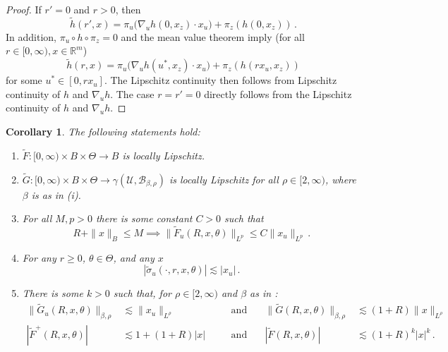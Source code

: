 \documentclass[final]{amsart}
\newtheorem{cor}[thm]{Corollary}
\numberwithin{thm}{section}
\numberwithin{equation}{section}
\newcommand{\U}{\mathcal{U}}
\newcommand{\R}{\mathbb{R}}
\newcommand{\B}{\mathcal{B}}
\begin{document}
\begin{proof}
 If $r' = 0$ and $r > 0$, then 
\begin{equation}
    \tilde h(r',x) = \pi_u\Big( \nabla_u h(0,x_z)\cdot x_u\Big) + \pi_z(h(0,x_z)) \,.
\end{equation}
 In addition, 
$\pi_u \circ h \circ \pi_z = 0$ and the  mean value theorem imply  (for all $r \in [0,\infty), x \in \R^m$)
\begin{equation}\label{eq:mvt-for-tilde-h}
    \tilde h(r,x) = \pi_u\Big( \nabla_u h(u^*,x_z) \cdot x_u\Big) + \pi_z(h(rx_u,x_z))
\end{equation}
for some $u^* \in [0,rx_u]$. The Lipschitz continuity then follows 
from Lipschitz continuity of $h$ and $\nabla_u h$. 
The case $r = r' = 0$ directly follows from the Lipschitz continuity of $h$ and $\nabla_u h$. 
\end{proof}

\begin{cor}\label{lem:lipschitz-f-g}
The following statements hold:
\begin{enumerate}[label=(\roman*)]
    \item $\tilde F: [0,\infty) \times B \times \Theta \to B$ is locally Lipschitz.
    \item $\tilde G: [0,\infty) \times B \times \Theta \to \gamma(\U,\B_{\beta,\rho})$ is locally Lipschitz for all $\rho \in [2,\infty)$, where $\beta$ is as in (i).
    \item For all $M,p > 0$ there is some constant $C > 0$ such that
    \begin{equation}\label{eq:local-u-bound}
        R+\|x\|_B \leq M \implies \|\tilde F_u(R,x,\theta)\|_{L^p} \leq C\|x_u\|_{L^p} \,.
    \end{equation}
    \item For any $r \geq 0$, $\theta \in \Theta$, and any $x$
    \begin{equation}\label{eq:sigma-u-bound} 
        |\tilde \sigma_u(\cdot,r,x,\theta)| \lesssim |x_u| \,.
    \end{equation}
    \item There is some $k > 0$ such that, for $\rho \in [2,\infty)$ and $\beta$ as in :
    \begin{equation}\label{eq:local-u-bound-G}
    \begin{aligned}
         \|\tilde G_u(R,x,\theta)\|_{\beta,\rho} &\lesssim \|x_u\|_{L^\rho} &\quad &\text{and} &\quad \|\tilde G(R,x,\theta)\|_{\beta,\rho} &\lesssim (1+R)\|x\|_{L^\rho}\\
         |\tilde F^+(R,x,\theta)| &\lesssim 1 + (1+R)|x| &\quad &\text{and} &\quad |\tilde F(R,x,\theta)| &\lesssim (1+R)^k|x|^k
         \,.
    \end{aligned}
    \end{equation}
\end{enumerate}
\end{cor}
\end{document}
